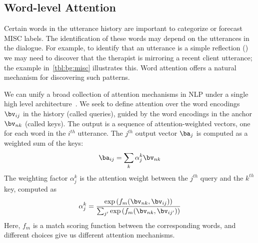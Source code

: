 \subsection{Word-level Attention}
\label{ssec:word_att}

Certain words in the utterance history are important to categorize or
forecast MISC labels. The identification of these words may depend on
the utterances in the dialogue. For example, to identify that an
utterance is a simple reflection (\RES) we may need to discover that
the therapist is mirroring a recent client utterance; the example
in~\autoref{tbl:bg:misc} illustrates this. Word attention offers a
natural mechanism for discovering such patterns.


We can unify a broad collection of attention mechanisms in NLP under
a single high level architecture~\cite{galassi2019attention}. We
seek to define attention over the word encodings $\bv_{ij}$ in the
history (called queries), guided by the word encodings in the anchor
$\bv_{nk}$ (called keys). The output is a sequence of
attention-weighted vectors, one for each word in the $i^{th}$
utterance.  The $j^{th}$ output vector $\ba_j$ is computed as a
weighted sum of the keys:
\begin{equation}
  \ba_{ij} = \sum_{k} \alpha^{k}_{j} \bv_{nk}
\label{eq:att_sum}
\end{equation}
The weighting factor $\alpha^k_j$ is the attention weight between
the $j^{th}$ query and the $k^{th}$ key, computed as
\begin{equation}
\label{eq:att_weight}
\alpha^{k}_{j} = \frac{\exp\left(f_{m}(\bv_{nk}, \bv_{ij})\right)}{\sum_{j^{\prime}} \exp\left(f_{m}(\bv_{nk}, \bv_{ij^\prime})\right)}
\end{equation}
Here, $f_m$ is a match scoring function between the corresponding
words, and different choices give us different attention mechanisms.

